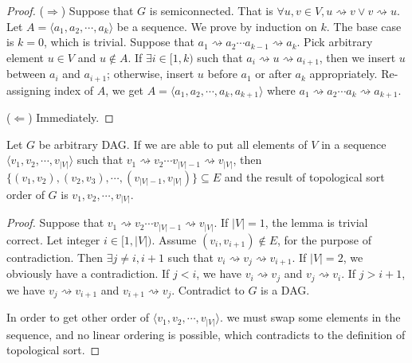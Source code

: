 \begin{proof}
    ($\Longrightarrow$)
    Suppose that $G$ is semiconnected.
    That is $\forall u,v \in V, u \rightsquigarrow v \vee v \rightsquigarrow u$.
    Let $A = \langle a_1, a_2, \cdots, a_k \rangle$ be a sequence.
    We prove by induction on $k$.
    The base case is $k=0$, which is trivial.
    Suppose that
    $a_1 \rightsquigarrow a_2 \cdots a_{k-1} \rightsquigarrow a_k$.
    Pick arbitrary element $u \in V$ and $u \notin A$.
    If $\exists i \in [1,k)$ such that 
    $a_i \rightsquigarrow u \rightsquigarrow a_{i+1}$,
    then we insert $u$ between $a_i$ and $a_{i+1}$;
    otherwise, insert $u$ before $a_1$ or after $a_k$ appropriately.
    Re-assigning index of $A$,
    we get $A = \langle a_1, a_2, \cdots, a_k, a_{k+1} \rangle$
    where $a_1 \rightsquigarrow a_2 \cdots a_k \rightsquigarrow a_{k+1}$.

    ($\Longleftarrow$)
    Immediately.
\end{proof}

\begin{lemma}
    Let $G$ be arbitrary DAG.
    If we are able to put all elements of $V$ in a sequence 
    $\langle v_1, v_2, \cdots, v_{|V|} \rangle$ such that 
    $v_1 \rightsquigarrow v_2 \cdots v_{|V|-1} \rightsquigarrow v_{|V|}$,
    then $\{ (v_1,v_2), (v_2,v_3), \cdots, (v_{|V|-1}, v_{|V|}) \} \subseteq E$ and
    the result of topological sort order of $G$ is
    $v_1, v_2, \cdots, v_{|V|}$.
\end{lemma}

\begin{proof}
    Suppose that $v_1 \rightsquigarrow v_2 \cdots v_{|V|-1} \rightsquigarrow v_{|V|}$.
    If $|V|=1$, the lemma is trivial correct.
    Let integer $i \in [1,|V|)$.
    Assume $(v_i, v_{i+1}) \notin E$, for the purpose of contradiction.
    Then $\exists j \neq i, i+1$ such that 
    $v_i \rightsquigarrow v_j \rightsquigarrow v_{i+1}$.
    If $|V|=2$, we obviously have a contradiction.
    If $j < i$, we have 
    $v_i \rightsquigarrow v_j$ and $v_j \rightsquigarrow v_i$.
    If $j > i+1$, we have 
    $v_j \rightsquigarrow v_{i+1}$ and $v_{i+1} \rightsquigarrow v_j$.
    Contradict to $G$ is a DAG.
    
    In order to get other order of $\langle v_1, v_2, \cdots, v_{|V|} \rangle$.
    we must swap some elements in the sequence, and no linear ordering is possible,
    which contradicts to the definition of topological sort.
\end{proof}

